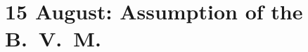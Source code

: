 {
\section{15 August: Assumption of the B.~V.~M.}
\subtitle{ Class}
\subtitle{I \& II Vespers}
\medskip

\def\deusinadjutoriumsolemn{T}
\def\precollect{\needspace{8\baselineskip}}

\def\definevesperspropers{}
\def\definevesperspropersalt{
  \let\oldthing=\maganttranslation
  \def\maganttranslation{\oldthing\needspace{10\baselineskip}}
}
\def\premagtitle{\needspace{12\baselineskip}}
\def\vesperspropersnote{At II Vespers:}
\def\vesperspropersaltnote{At I Vespers:}
\def\printfullhymn{
  {
    \oldneedspace{3\baselineskip}
    \printnote{At II Vespers: Hymn.~\emph{Ave Maris Stella}, p.~\pageref{hymn-avemarisstella}. \Vbar{} \emph{Exaltata.} p.~\pageref{vr-assumption}.\\}

    \printnote{\vesperspropersaltnote}
    \definevesperspropersalt
    \printhymn{\oldstylenums{\hymnlinetwo}}{\hymninitial}{\hymntex}{\hymntranslation}
  }
  {
    \def\vrlinebreak{T}
    \oldneedspace{3\baselineskip}
    \label{vr-assumption}
    \printvr[\greseteolcustos{manual}]{\vrtex}{\vtranslation}{\rtranslation}
  }
}


}
